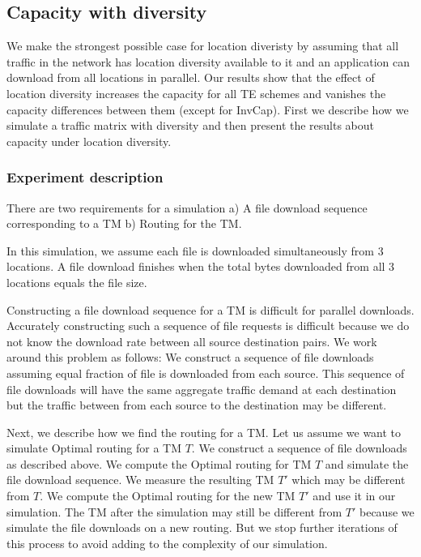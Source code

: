 \subsection{Capacity with diversity}
We make the strongest possible case for location diveristy by assuming that all traffic in the network has location diversity available to it and an application can download from all locations in parallel. Our results show that the effect of location diversity increases the capacity for all TE schemes and vanishes the capacity differences between them (except for InvCap). First we describe how we simulate a traffic matrix with diversity and then present the results about capacity under location diversity.


\subsubsection{Experiment description}
There are two requirements for a simulation a) A file download sequence corresponding to a TM b) Routing for the TM.

In this simulation, we assume each file is downloaded simultaneously from 3 locations. A file download finishes when the total bytes downloaded from all 3 locations equals  the file size.  

Constructing a file download sequence for a TM is difficult for parallel downloads. Accurately constructing such a sequence of file requests is difficult because we do not know the download rate between all source destination pairs. We work around this problem as follows: We construct a sequence of file downloads assuming equal fraction of file is downloaded from each source. This sequence of file downloads will have the same aggregate traffic demand at each destination but the traffic between from each source to the destination may be different. 

Next, we describe how we find the routing for a TM. Let us assume we want to simulate Optimal routing for a TM $T$. We construct a sequence of file downloads as described above. We compute the Optimal routing for TM $T$ and simulate the  file download sequence. We measure the resulting TM $T'$ which may be different from $T$. We compute the Optimal routing for the new TM $T'$ and use it in our simulation. The TM after the simulation may still be different from $T'$ because we simulate the file downloads on a new routing. But we stop further iterations of this process to avoid adding to the complexity of our simulation.

